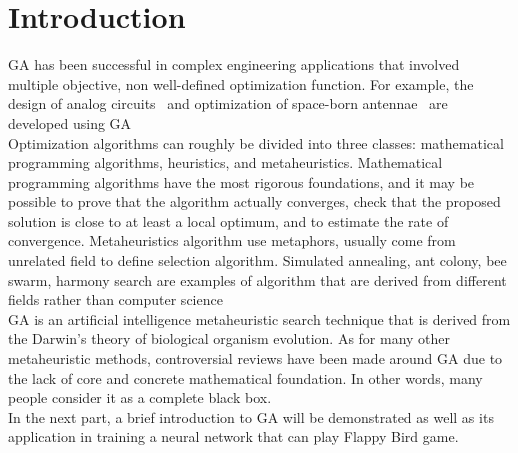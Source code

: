\documentclass[conference]{IEEEtran}
\begin{document}
\section{Introduction}
GA has been successful in complex engineering applications that involved multiple objective, non well-defined optimization function. For example, the design of analog circuits~\cite{1} and optimization of space-born antennae~\cite{2} are developed using GA\\
\indent
Optimization algorithms can roughly be divided into three classes: mathematical programming algorithms, heuristics, and metaheuristics. Mathematical programming algorithms have the most rigorous foundations, and it may be possible to prove that the algorithm actually converges, check that the proposed solution is close to at least a local optimum, and to estimate the rate of convergence. Metaheuristics algorithm use metaphors, usually come from unrelated field to define selection algorithm. Simulated annealing, ant colony, bee swarm, harmony search are examples of algorithm that are derived from different fields rather than computer science \\
\indent
GA is an artificial intelligence metaheuristic search technique that is derived from the Darwin's theory of biological organism evolution. As for many other metaheuristic methods, controversial reviews have been made around GA due to the lack of core and concrete mathematical foundation. In other words, many people consider it as a complete black box.\\
\indent
In the next part, a brief introduction to GA will be demonstrated as well as its application in training a neural network that can play Flappy Bird game.
\end{document}

